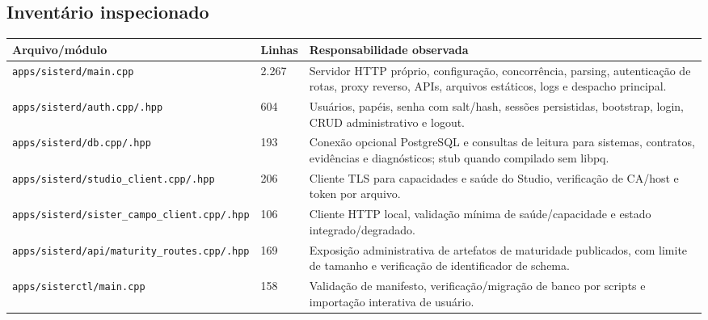 \documentclass[11pt,a4paper,oneside]{article}
\begin{document}
\subsection{Inventário inspecionado}
\begin{longtable}{P{5.0cm}P{1.6cm}P{7.7cm}}
\toprule
\textbf{Arquivo/módulo} & \textbf{Linhas} & \textbf{Responsabilidade observada} \\
\midrule
\endhead
\texttt{apps/sisterd/}\newline\texttt{main.cpp} & 2.267 & Servidor HTTP próprio, configuração, concorrência, parsing, autenticação de rotas, proxy reverso, APIs, arquivos estáticos, logs e despacho principal. \\
\texttt{apps/sisterd/}\newline\texttt{auth.cpp/.hpp} & 604 & Usuários, papéis, senha com salt/hash, sessões persistidas, bootstrap, login, CRUD administrativo e logout. \\
\texttt{apps/sisterd/}\newline\texttt{db.cpp/.hpp} & 193 & Conexão opcional PostgreSQL e consultas de leitura para sistemas, contratos, evidências e diagnósticos; stub quando compilado sem libpq. \\
\texttt{apps/sisterd/}\newline\texttt{studio\_client.cpp/.hpp} & 206 & Cliente TLS para capacidades e saúde do Studio, verificação de CA/host e token por arquivo. \\
\texttt{apps/sisterd/}\newline\texttt{sister\_campo\_client.}\allowbreak\texttt{cpp/.hpp} & 106 & Cliente HTTP local, validação mínima de saúde/capacidade e estado integrado/degradado. \\
\texttt{apps/sisterd/api/}\newline\texttt{maturity\_routes.cpp/.hpp} & 169 & Exposição administrativa de artefatos de maturidade publicados, com limite de tamanho e verificação de identificador de schema. \\
\texttt{apps/sisterctl/}\newline\texttt{main.cpp} & 158 & Validação de manifesto, verificação/migração de banco por scripts e importação interativa de usuário. \\
\bottomrule
\end{longtable}
\end{document}
